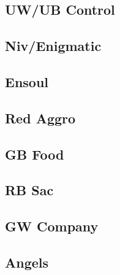 \documentclass[12pt]{article}
\begin{document}
\subsection{UW/UB Control}

\subsection{Niv/Enigmatic}

\subsection{Ensoul}

\subsection{Red Aggro}

\subsection{GB Food}

\subsection{RB Sac}

\subsection{GW Company}

\subsection{Angels}
\end{document}
